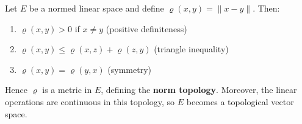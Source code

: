 Let $E$ be a normed linear space and define $\varrho(x, y) = \|x - y\|$. Then:

\begin{enumerate}
\item $\varrho(x, y) > 0$ if $x \neq y$ (positive definiteness)
\item $\varrho(x, y) \leq \varrho(x, z) + \varrho(z, y)$ (triangle inequality)
\item $\varrho(x, y) = \varrho(y, x)$ (symmetry)
\end{enumerate}

Hence $\varrho$ is a metric in $E$, defining the \textbf{norm topology}. Moreover, the linear operations are continuous in this topology, so $E$ becomes a topological vector space.
